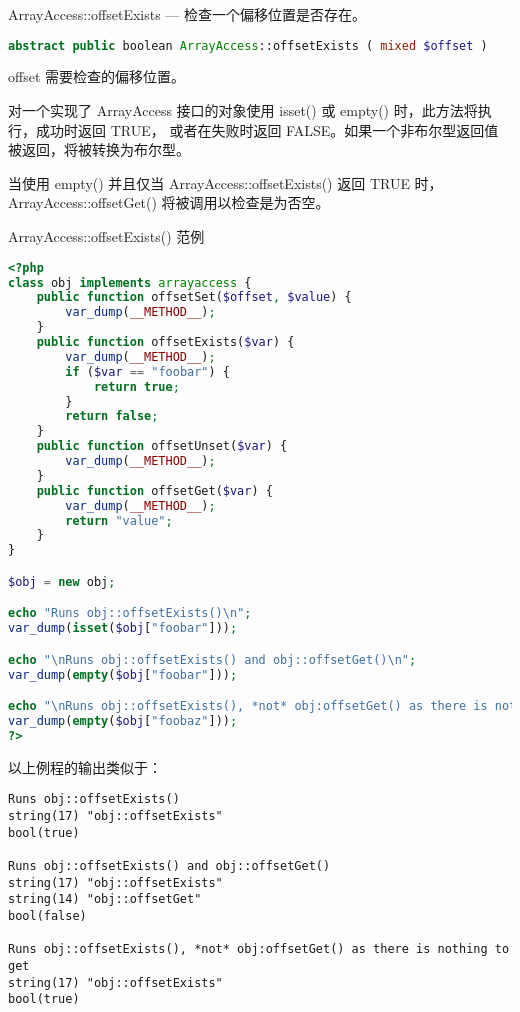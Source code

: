 ArrayAccess::offsetExists — 检查一个偏移位置是否存在。


\begin{lstlisting}[language=PHP]
abstract public boolean ArrayAccess::offsetExists ( mixed $offset )
\end{lstlisting}

\begin{compactitem}
\item offset
需要检查的偏移位置。
\end{compactitem}

对一个实现了 ArrayAccess 接口的对象使用 isset() 或 empty() 时，此方法将执行，成功时返回 TRUE， 或者在失败时返回 FALSE。如果一个非布尔型返回值被返回，将被转换为布尔型。

当使用 empty() 并且仅当 ArrayAccess::offsetExists() 返回 TRUE 时， ArrayAccess::offsetGet() 将被调用以检查是为否空。


\begin{example}
ArrayAccess::offsetExists() 范例
\begin{lstlisting}[language=PHP]
<?php
class obj implements arrayaccess {
    public function offsetSet($offset, $value) {
        var_dump(__METHOD__);
    }
    public function offsetExists($var) {
        var_dump(__METHOD__);
        if ($var == "foobar") {
            return true;
        }
        return false;
    }
    public function offsetUnset($var) {
        var_dump(__METHOD__);
    }
    public function offsetGet($var) {
        var_dump(__METHOD__);
        return "value";
    }
}

$obj = new obj;

echo "Runs obj::offsetExists()\n";
var_dump(isset($obj["foobar"]));

echo "\nRuns obj::offsetExists() and obj::offsetGet()\n";
var_dump(empty($obj["foobar"]));

echo "\nRuns obj::offsetExists(), *not* obj:offsetGet() as there is nothing to get\n";
var_dump(empty($obj["foobaz"]));
?>
\end{lstlisting}
\end{example}

以上例程的输出类似于：

\begin{verbatim}
Runs obj::offsetExists()
string(17) "obj::offsetExists"
bool(true)

Runs obj::offsetExists() and obj::offsetGet()
string(17) "obj::offsetExists"
string(14) "obj::offsetGet"
bool(false)

Runs obj::offsetExists(), *not* obj:offsetGet() as there is nothing to get
string(17) "obj::offsetExists"
bool(true)
\end{verbatim}

